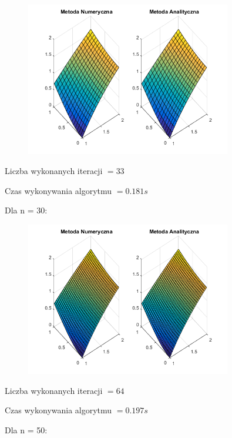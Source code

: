 \begin{figure}[!ht]
	\begin{center}
		\includegraphics[width=0.8\textwidth]{Lab6/charts/young/zad1/15.png}
	\end{center}
\end{figure}

Liczba wykonanych iteracji $ = 33 $

Czas wykonywania algorytmu $ = 0.181 s$

Dla n = 30:

\begin{figure}[!ht]
	\begin{center}
		\includegraphics[width=0.8\textwidth]{Lab6/charts/young/zad1/30.png}
	\end{center}
\end{figure}

Liczba wykonanych iteracji $ = 64 $

Czas wykonywania algorytmu $ = 0.197 s$

Dla n = 50:


